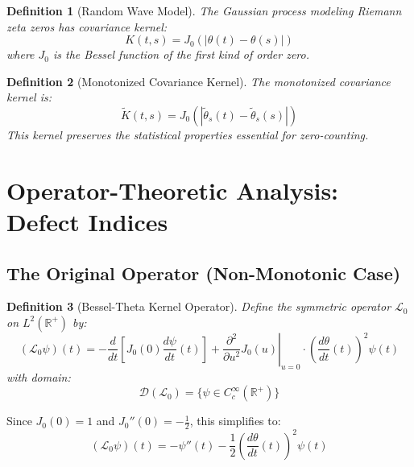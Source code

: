 \documentclass{article}
\newtheorem{definition}{Definition}
\begin{document}
\begin{definition}
  [Random Wave Model] The Gaussian process modeling Riemann zeta zeros has
  covariance kernel:
  \begin{equation}
    K (t, s) = J_0 (| \theta (t) - \theta (s) |)
  \end{equation}
  where $J_0$ is the Bessel function of the first kind of order zero.
\end{definition}

\begin{definition}
  [Monotonized Covariance Kernel] The monotonized covariance kernel is:
  \begin{equation}
    \tilde{K} (t, s) = J_0 (| \tilde{\theta}_s (t) - \tilde{\theta}_s (s) |)
  \end{equation}
  This kernel preserves the statistical properties essential for
  zero-counting.
\end{definition}

\section{Operator-Theoretic Analysis: Defect Indices}

\subsection{The Original Operator (Non-Monotonic Case)}

\begin{definition}
  [Bessel-Theta Kernel Operator] Define the symmetric operator $\mathcal{L}_0$
  on $L^2 (\mathbb{R}^+)$ by:
  \begin{equation}
    (\mathcal{L}_0 \psi) (t) = - \frac{d}{dt} \left[ J_0 (0) \frac{d \psi}{dt}
    (t) \right] + \left. \frac{\partial^2}{\partial u^2} J_0 (u) \right|_{u =
    0} \cdot \left( \frac{d \theta}{dt} (t) \right)^2 \psi (t)
  \end{equation}
  with domain:
  \begin{equation}
    \mathcal{D} (\mathcal{L}_0) = \{\psi \in C_c^{\infty} (\mathbb{R}^+)\}
  \end{equation}
\end{definition}

\begin{remark}
  Since $J_0 (0) = 1$ and $J_0'' (0) = - \frac{1}{2}$, this simplifies to:
  \begin{equation}
    (\mathcal{L}_0 \psi) (t) = - \psi'' (t) - \frac{1}{2} \left( \frac{d
    \theta}{dt} (t) \right)^2 \psi (t)
  \end{equation}
\end{remark}
\end{document}
